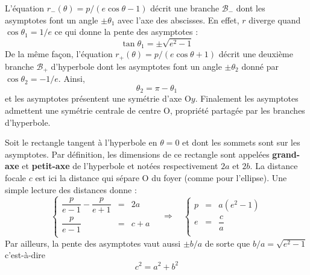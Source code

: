 L'équation \(r_{-}(\theta)=p/(e\cos\theta -1)\) décrit une branche $\mathcal{B}_{-}$ dont les asymptotes font un angle $\pm \theta_{1}$ avec l'axe des abscisses. En effet, $r$ diverge quand $\cos\theta_{1}=1/e$ ce qui donne la pente des asymptotes :
\[
\tan\theta_{1}=\pm\sqrt{e^{2}-1}
\]
De la même fa\c con, l'équation \(r_{+}(\theta)=p/(e\cos\theta +1)\) décrit une deuxième branche $\mathcal{B}_{+}$ d'hyperbole dont les asymptotes font un angle $\pm\theta_{2}$ donné par $\cos\theta_{2}=-1/e$. Ainsi,
\[
\theta_{2}=\pi-\theta_{1}
\]
et les asymptotes présentent une symétrie d'axe O$y$. Finalement les asymptotes admettent une symétrie centrale de centre O, propriété partagée par les branches d'hyperbole.

Soit le rectangle tangent à l'hyperbole en $\theta=0$  et dont les sommets sont sur les asymptotes. Par définition, les dimensions de ce rectangle sont appelées \textbf{grand-axe} et \textbf{petit-axe} de l'hyperbole et notées respectivement $2a$ et $2b$. La distance focale $c$ est ici la distance qui sépare O du foyer (comme pour l'ellipse). Une simple lecture des distances donne :
\[
\left\{\begin{array}{rcl}
\dfrac{p}{e-1}-\dfrac{p}{e+1} 	&=& 2a  \\[4mm]
\dfrac{p}{e-1}  			&=& c+a   \\   
\end{array}\right.
\quad\Longrightarrow\quad
\left\{\begin{array}{rcl}
p 	&=& a(e^{2}-1)  \\[4mm]
e	&=& \dfrac{c}{a}   \\   
\end{array}\right.
\]
Par ailleurs, la pente des asymptotes vaut aussi $\pm b/a$ de sorte que $b/a=\sqrt{e^{2}-1}$ c'est-à-dire 
\begin{equation}
\boxed{
c^{2}=a^{2}+b^{2}
}
\label{eq:C7relation_entre_a_b_et_c_pour_hyperbole}
\end{equation}
	


